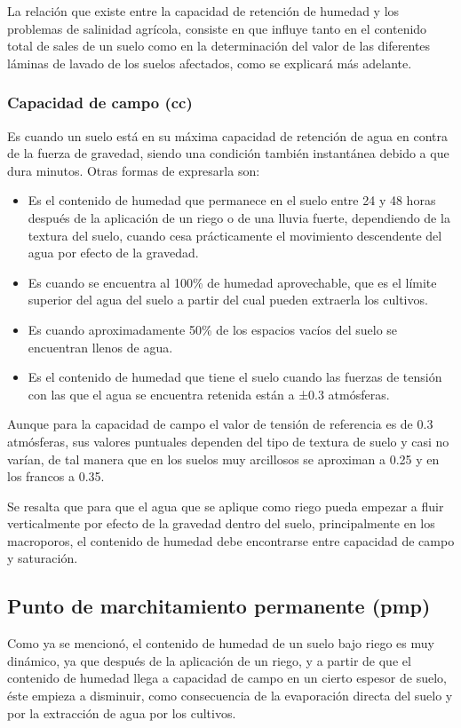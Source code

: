 La relación que existe entre la capacidad de retención de humedad y los problemas de salinidad agrícola, consiste en que influye tanto en el contenido total de sales de un suelo como en la determinación del valor de las diferentes láminas de lavado de los suelos afectados, como se explicará más adelante.

\subsubsection{Capacidad de campo (cc)}
Es cuando un suelo está en su máxima capacidad de retención de agua en
contra de la fuerza de gravedad, siendo una condición también instantánea
debido a que dura minutos. Otras formas de expresarla son:
\begin{itemize}
\item Es el contenido de humedad que permanece en el suelo entre 24 y 48 horas después de la aplicación de un riego o de una lluvia fuerte, dependiendo de la textura del suelo, cuando cesa prácticamente el movimiento descendente del agua por efecto de la gravedad.
\item Es cuando se encuentra al 100\% de humedad aprovechable, que es el límite superior del agua del suelo a partir del cual pueden extraerla los cultivos.
\item Es cuando aproximadamente 50\% de los espacios vacíos del suelo se encuentran llenos de agua.
\item Es el contenido de humedad que tiene el suelo cuando las fuerzas de tensión con las que el agua se encuentra retenida están a ±0.3 atmósferas.
\end{itemize}
Aunque para la capacidad de campo el valor de tensión de referencia es de 0.3 atmósferas, sus valores puntuales dependen del tipo de textura de suelo y casi no varían, de tal manera que en los suelos muy arcillosos se aproximan a 0.25 y en los francos a 0.35.

Se resalta que para que el agua que se aplique como riego pueda empezar a fluir verticalmente por efecto de la gravedad dentro del suelo, principalmente en los macroporos, el contenido de humedad debe encontrarse entre capacidad de campo y saturación.
\subsection{Punto de marchitamiento permanente (pmp)}
Como ya se mencionó, el contenido de humedad de un suelo bajo riego es muy dinámico, ya que después de la aplicación de un riego, y a partir de que el contenido de humedad llega a capacidad de campo en un cierto espesor de suelo, éste empieza a disminuir, como consecuencia de la evaporación directa del suelo y por la extracción de agua por los cultivos.

